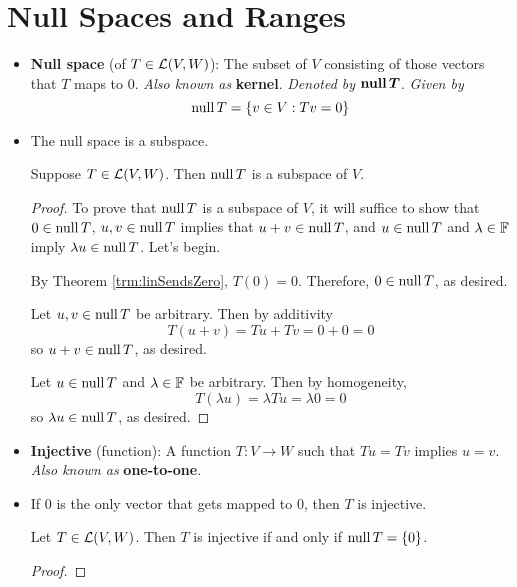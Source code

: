 \documentclass[../main.tex]{subfiles}
\begin{document}
\section{Null Spaces and Ranges}
\begin{itemize}
    \item \textbf{Null space} (of $T\in\mathcal{L}(V,W)$): The subset of $V$ consisting of those vectors that $T$ maps to 0. \emph{Also known as} \textbf{kernel}. \emph{Denoted by} $\bm{\nul T}$. \emph{Given by}
    \begin{equation*}
        \operatorname{null} T = \{v\in V:Tv=0\}
    \end{equation*}
    \item The null space is a subspace.
    \begin{theorem}\label{trm:nullSpace}
        Suppose $T\in\mathcal{L}(V,W)$. Then $\operatorname{null} T$ is a subspace of $V$.
        \begin{proof}
            To prove that $\operatorname{null} T$ is a subspace of $V$, it will suffice to show that $0\in\operatorname{null} T$, $u,v\in\operatorname{null} T$ implies that $u+v\in\operatorname{null} T$, and $u\in\operatorname{null} T$ and $\lambda\in\mathbb{F}$ imply $\lambda u\in\operatorname{null} T$. Let's begin.\par
            By Theorem \ref{trm:linSendsZero}, $T(0)=0$. Therefore, $0\in\operatorname{null} T$, as desired.\par
            Let $u,v\in\operatorname{null} T$ be arbitrary. Then by additivity
            \begin{equation*}
                T(u+v) = Tu+Tv = 0+0 = 0
            \end{equation*}
            so $u+v\in\operatorname{null} T$, as desired.\par
            Let $u\in\operatorname{null} T$ and $\lambda\in\mathbb{F}$ be arbitrary. Then by homogeneity,
            \begin{equation*}
                T(\lambda u) = \lambda Tu = \lambda 0 = 0
            \end{equation*}
            so $\lambda u\in\operatorname{null} T$, as desired.
        \end{proof}
    \end{theorem}
    \item \textbf{Injective} (function): A function $T:V\to W$ such that $Tu=Tv$ implies $u=v$. \emph{Also known as} \textbf{one-to-one}.
    \item If 0 is the only vector that gets mapped to 0, then $T$ is injective.
    \begin{theorem}\label{trm:nullSpaceInjective}
        Let $T\in\mathcal{L}(V,W)$. Then $T$ is injective if and only if $\operatorname{null} T=\{0\}$.
        \begin{proof}

\end{proof}
\end{theorem}
\end{itemize}
\end{document}
